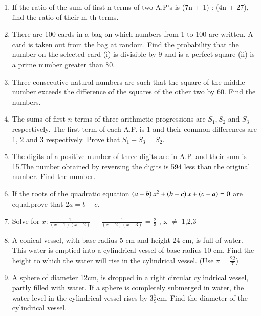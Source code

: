 \documentclass[book,11pt,onecolumn]{IEEEtran}
\renewcommand\thesection{\arabic{section}}
\begin{document}
\begin{enumerate}[label=\thesection.\arabic*.,ref=\thesection.\theenumi]
\item  If the ratio of the sum of first n terms of two A.P's is (7n + 1) : (4n + 27), find the ratio of their m th terms.\\
\item There are 100 cards in a bag on which numbers from 1 to 100 are written. A card is taken out from the bag at random. Find the probability that the number on the selected card (i) is divisible by 9 and is a perfect square
(ii) is a prime number greater than 80.\\
\item Three consecutive natural numbers are such that the square of the middle number exceeds the difference of the squares of the other two by 60. Find the numbers.\\
\item The sums of first $n$ terms of three arithmetic progressions are $S_1, S_2$ and $S_3$ respectively. The first term of each A.P. is 1 and their common differences are 1, 2 and 3 respectively. Prove that $S_1+S_3=S_2$.\\
\item The digits of a positive number of three digits are in A.P. and their sum is 15.The number obtained by reversing the digits is 594 less than the original number. Find the number.\\
\item If the roots of the quadratic equation $\left(a-b\right)x^2+\left(b-c\right)x+\left(c-a\right)=0$ are equal,prove that $2a=b+c$.\\
\item  Solve for $ x :  \frac{1}{(x-1)(x-2)} $ + $ \frac{1}{(x-2)(x-3)} $ = $ \frac{2}{3}$ , x $\neq$ 1,2,3   \\     
\item  A conical vessel, with base radius 5 cm and height 24 cm, is full of water. This water is emptied into a cylindrical vessel of base radius 10 cm. Find the height to which the water will rise in the cylindrical vessel. (Use $ \pi  = \frac{22}{7}$)\\

\item  A sphere of diameter 12cm, is dropped in a right circular cylindrical vessel, partly filled with water. If a sphere is completely submerged in water, the water level in the cylindrical vessel rises by $ 3 \frac{5}{9}$cm. Find the diameter of the cylindrical vessel.\\  


\end{enumerate}
\end{document}
